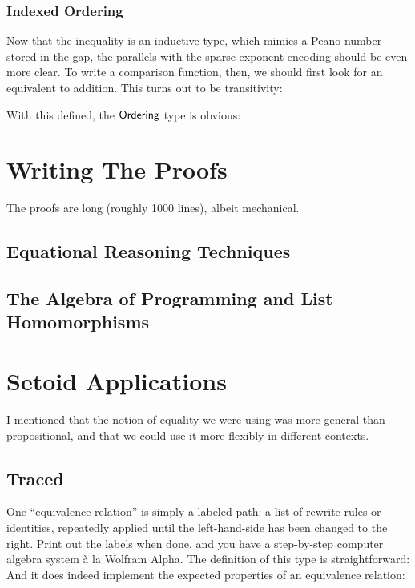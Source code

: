 \documentclass[draft, twocolumn]{article}
\begin{document}
\subsubsection{Indexed Ordering}
Now that the inequality is an inductive type, which mimics a Peano number stored
in the gap, the parallels with the sparse exponent encoding should be even more
clear. To write a comparison function, then, we should first look for an
equivalent to addition. This turns out to be transitivity:

With this defined, the \(\AgdaDatatype{Ordering}\) type is obvious:

\section{Writing The Proofs}
The proofs are long (roughly 1000 lines), albeit mechanical.
\subsection{Equational Reasoning Techniques}
\subsection{The Algebra of Programming and List Homomorphisms}
\section{Setoid Applications} \label{setoid-applications}
I mentioned that the notion of equality we were using was more general than
propositional, and that we could use it more flexibly in different contexts.
\subsection{Traced}
One ``equivalence relation'' is simply a labeled path: a list of rewrite rules
or identities, repeatedly applied until the left-hand-side has been changed to
the right. Print out the labels when done, and you have a step-by-step computer
algebra system à la Wolfram Alpha. The definition of this type is
straightforward:
And it does indeed implement the expected properties of an equivalence relation:
\end{document}
